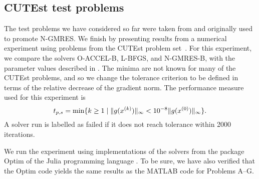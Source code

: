 \documentclass[main.tex]{subfiles}
\begin{document}
\subsection{CUTEst test problems}
The test problems we have considered so far were taken from
\citet{sterck2013steepest} and originally used to promote N-GMRES. We
finish by presenting results from a numerical experiment using
problems from the CUTEst problem set~\cite{gould2015cutest}.  For this
experiment, we compare the solvers O-ACCEL-B, L-BFGS, and N-GMRES-B,
with the parameter values described in
.  The minima are not known for many of
the CUTEst problems, and so we change the tolerance criterion to be
defined in terms of the relative decrease of the gradient norm.  The
performance measure used for this experiment is
\begin{equation}\label{eq:def_performance_measure_cutest}
  t_{p,s} = \min\{k\geq 1 \mid \|g(x^{(k)})\|_\infty < 10^{-8}\|g(x^{(0)})\|_\infty\}.
\end{equation}
A solver run is labelled as failed if it does not reach tolerance
within \num{2000} iterations.

We run the experiment using implementations of the solvers from the
package Optim \citep{mogensen2018optim} of the Julia programming
language \citep{bezanson2017julia}. To be sure, we have also verified
that the Optim code yields the same results as the MATLAB code for
Problems A--G.
\end{document}
